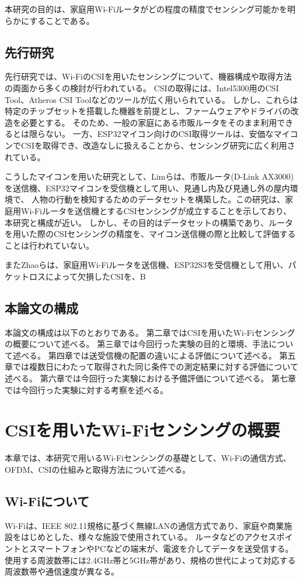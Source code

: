 \documentclass[uplatex, 12pt]{ujbook}
\begin{document}
本研究の目的は、家庭用Wi-Fiルータがどの程度の精度でセンシング可能かを明らかにすることである。


\section{先行研究}
先行研究では、Wi-FiのCSIを用いたセンシングについて、機器構成や取得方法の両面から多くの検討が行われている。
CSIの取得には、Intel5300用のCSI Tool、Atheros CSI Toolなどのツールが広く用いられている。
しかし、これらは特定のチップセットを搭載した機器を前提とし、ファームウェアやドライバの改造を必要とする。
そのため、一般の家庭にある市販ルータをそのまま利用できるとは限らない。
一方、ESP32マイコン向けのCSI取得ツールは、安価なマイコンでCSIを取得でき、改造なしに扱えることから、センシング研究に広く利用されている。


こうしたマイコンを用いた研究として、Limらは、市販ルータ(D-Link AX3000)を送信機、ESP32マイコンを受信機として用い、見通し内及び見通し外の屋内環境で、
人物の行動を検知するためのデータセットを構築した。この研究は、家庭用Wi-Fiルータを送信機とするCSIセンシングが成立することを示しており、本研究と構成が近い。
しかし、その目的はデータセットの構築であり、ルータを用いた際のCSIセンシングの精度を、マイコン送信機の際と比較して評価することは行われていない。


またZhaoらは、家庭用Wi-Fiルータを送信機、ESP32S3を受信機として用い、パケットロスによって欠損したCSIを、B

\section{本論文の構成}
本論文の構成は以下のとおりである。
第二章ではCSIを用いたWi-Fiセンシングの概要について述べる。
第三章では今回行った実験の目的と環境、手法について述べる。
第四章では送受信機の配置の違いによる評価について述べる。
第五章では複数日にわたって取得された同じ条件での測定結果に対する評価について述べる。
第六章では今回行った実験における予備評価について述べる。
第七章では今回行った実験に対する考察を述べる。
\chapter{CSIを用いたWi-Fiセンシングの概要}
本章では、本研究で用いるWi-Fiセンシングの基礎として、Wi-Fiの通信方式、OFDM、CSIの仕組みと取得方法について述べる。
\section{Wi-Fiについて}
Wi-Fiは、IEEE 802.11規格に基づく無線LANの通信方式であり、家庭や商業施設をはじめとした、様々な施設で使用されている。
ルータなどのアクセスポイントとスマートフォンやPCなどの端末が、電波を介してデータを送受信する。
使用する周波数帯には2.4GHz帯と5GHz帯があり、規格の世代によって対応する周波数帯や通信速度が異なる。
\end{document}
